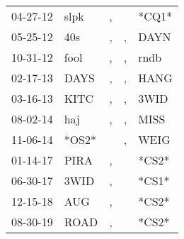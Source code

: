 \begin{supertabular}{lllll}
 04-27-12 &   slpk &  , &    &  *CQ1* \\
 05-25-12 &    40s &  , &  , &   DAYN \\
 10-31-12 &   fool &  , &  , &   rndb \\
 02-17-13 &   DAYS &  , &  , &   HANG \\
 03-16-13 &   KITC &  , &  , &   3WID \\
 08-02-14 &    haj &  , &  , &   MISS \\
 11-06-14 &  *OS2* &    &  , &   WEIG \\
 01-14-17 &   PIRA &  , &    &  *CS2* \\
 06-30-17 &   3WID &  , &    &  *CS1* \\
 12-15-18 &    AUG &  , &    &  *CS2* \\
 08-30-19 &   ROAD &  , &    &  *CS2* \\
\end{supertabular}
